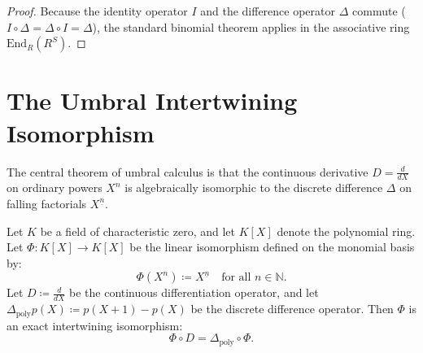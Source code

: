\begin{proof}
Because the identity operator $I$ and the difference operator $\Delta$ commute ($I \circ \Delta = \Delta \circ I = \Delta$), the standard binomial theorem applies in the associative ring $\mathrm{End}_R(R^S)$.
\end{proof}

\section{The Umbral Intertwining Isomorphism}

The central theorem of umbral calculus is that the continuous derivative $D = \frac{d}{dX}$ on ordinary powers $X^n$ is algebraically isomorphic to the discrete difference $\Delta$ on falling factorials $X^{\underline{n}}$.

\begin{theorem}
\label{thm:umbral_iso}
Let $K$ be a field of characteristic zero, and let $K[X]$ denote the polynomial ring. Let $\Phi : K[X] \to K[X]$ be the linear isomorphism defined on the monomial basis by:
\begin{equation}
\Phi(X^n) \coloneqq X^{\underline{n}} \quad \text{for all } n \in \mathbb{N}.
\end{equation}
Let $D \coloneqq \frac{d}{dX}$ be the continuous differentiation operator, and let $\Delta_{\mathrm{poly}} p(X) \coloneqq p(X+1) - p(X)$ be the discrete difference operator.
Then $\Phi$ is an exact intertwining isomorphism:
\begin{equation}
\Phi \circ D = \Delta_{\mathrm{poly}} \circ \Phi.
\end{equation}
\end{theorem}

